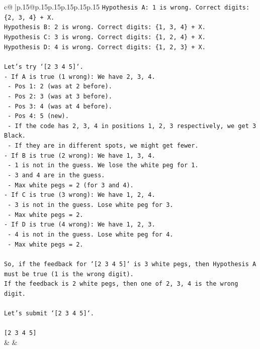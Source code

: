\documentclass{article}
\begin{document}
{\begin{supertabular}{c@{$\;$}|p{.15\linewidth}@{}p{.15\linewidth}p{.15\linewidth}p{.15\linewidth}p{.15\linewidth}p{.15\linewidth}}
{{{\texttt{Hypothesis A: 1 is wrong. Correct digits: \{2, 3, 4\} + X.} \\
\texttt{Hypothesis B: 2 is wrong. Correct digits: \{1, 3, 4\} + X.} \\
\texttt{Hypothesis C: 3 is wrong. Correct digits: \{1, 2, 4\} + X.} \\
\texttt{Hypothesis D: 4 is wrong. Correct digits: \{1, 2, 3\} + X.} \\
\\ 
\texttt{Let's try `{[}2 3 4 5{]}`.} \\
\texttt{{-} If A is true (1 wrong): We have 2, 3, 4.} \\
\texttt{  {-} Pos 1: 2 (was at 2 before).} \\
\texttt{  {-} Pos 2: 3 (was at 3 before).} \\
\texttt{  {-} Pos 3: 4 (was at 4 before).} \\
\texttt{  {-} Pos 4: 5 (new).} \\
\texttt{  {-} If the code has 2, 3, 4 in positions 1, 2, 3 respectively, we get 3 Black.} \\
\texttt{  {-} If they are in different spots, we might get fewer.} \\
\texttt{{-} If B is true (2 wrong): We have 1, 3, 4.} \\
\texttt{  {-} 1 is not in the guess. We lose the white peg for 1.} \\
\texttt{  {-} 3 and 4 are in the guess.} \\
\texttt{  {-} Max white pegs = 2 (for 3 and 4).} \\
\texttt{{-} If C is true (3 wrong): We have 1, 2, 4.} \\
\texttt{  {-} 3 is not in the guess. Lose white peg for 3.} \\
\texttt{  {-} Max white pegs = 2.} \\
\texttt{{-} If D is true (4 wrong): We have 1, 2, 3.} \\
\texttt{  {-} 4 is not in the guess. Lose white peg for 4.} \\
\texttt{  {-} Max white pegs = 2.} \\
\\ 
\texttt{So, if the feedback for `{[}2 3 4 5{]}` is 3 white pegs, then Hypothesis A must be true (1 is the wrong digit).} \\
\texttt{If the feedback is 2 white pegs, then one of 2, 3, 4 is the wrong digit.} \\
\\ 
\texttt{Let's submit `{[}2 3 4 5{]}`.} \\
\\ 
\texttt{{[}2 3 4 5{]}} \\
            }
        }
    }
    & & \\ \\


\end{supertabular}}
\end{document}
